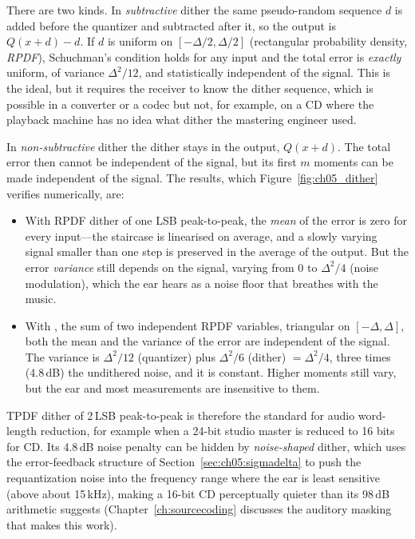 There are two kinds. In \emph{subtractive} dither the same pseudo-random sequence $d$ is added
before the quantizer and subtracted after it, so the output is $Q(x+d)-d$. If $d$ is uniform on
$[-\Delta/2,\Delta/2]$ (rectangular probability density, \emph{RPDF}), Schuchman's condition
holds for any input and the total error is \emph{exactly} uniform, of variance $\Delta^2/12$,
and statistically independent of the signal. This is the ideal, but it requires the receiver
to know the dither sequence, which is possible in a converter or a codec but not, for example,
on a CD where the playback machine has no idea what dither the mastering engineer used.

In \emph{non-subtractive} dither the dither stays in the output, $Q(x+d)$. The total error then
cannot be independent of the signal, but its first $m$ moments can be made independent of
the signal. The results, which Figure~\ref{fig:ch05_dither} verifies numerically, are:
\begin{itemize}
\item With RPDF dither of one LSB peak-to-peak, the \emph{mean} of the error is zero for every
input---the staircase is linearised on average, and a slowly varying signal smaller than one
step is preserved in the average of the output. But the error \emph{variance} still depends on
the signal, varying from 0 to $\Delta^2/4$ (noise modulation), which the ear hears as a noise
floor that breathes with the music.
\item With , the sum of two independent RPDF variables, triangular on
$[-\Delta,\Delta]$, both the mean and the variance of the error are independent of the signal. The
variance is $\Delta^2/12$ (quantizer) plus $\Delta^2/6$ (dither) $=\Delta^2/4$, three times
(4.8\,dB) the undithered noise, and it is constant. Higher moments still vary, but the ear and
most measurements are insensitive to them.
\end{itemize}
TPDF dither of 2\,LSB peak-to-peak is therefore the standard for audio word-length reduction,
for example when a 24-bit studio master is reduced to 16 bits for CD. Its 4.8\,dB noise penalty
can be hidden by \emph{noise-shaped} dither, which uses the error-feedback structure of
Section~\ref{sec:ch05:sigmadelta} to push the requantization noise into the frequency range
where the ear is least sensitive (above about 15\,kHz), making a 16-bit CD perceptually quieter
than its 98\,dB arithmetic suggests (Chapter~\ref{ch:sourcecoding} discusses the auditory
masking that makes this work).

